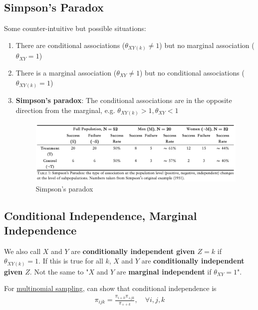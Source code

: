 \documentclass[11pt]{elegantbook}
\begin{document}
\subsection{Simpson's Paradox}
Some counter-intuitive but possible situations:
\begin{enumerate}
    \item There are conditional associations ($\theta_{XY(k)} \neq 1$) but no marginal
    association ($\theta_{XY} = 1$)
    \item There is a marginal association ($\theta_{XY} \neq 1$) but no conditional associations ($\theta_{XY(k)} = 1$)
    \item \textbf{Simpson's paradox}: The conditional associations are in the opposite direction from the marginal, e.g. $\theta_{XY(k)}>1,\theta_{XY}<1$
    \begin{center}\begin{figure}[htbp]
        \centering
        \includegraphics[scale=0.2]{Simpson's Paradox.png}
        \caption{Simpson's paradox}
        \label{}
    \end{figure}\end{center}
\end{enumerate}

\subsection{Conditional Independence, Marginal Independence}
\begin{definition}
    We also call $X$ and $Y$ are \textbf{conditionally independent given $Z = k$} if $\theta_{XY(k)}=1$. If this is true for all $k$, $X$ and $Y$ are \textbf{conditionally independent given $Z$}. Not the same to "$X$ and $Y$ are \textbf{marginal independent} if $\theta_{XY}=1$".
\end{definition}

\begin{proposition}
    For \underline{multinomial sampling}, can show that conditional independence is
    \begin{equation}
        \begin{aligned}
            \pi_{ijk}=\frac{\pi_{i+k}\pi_{+jk}}{\pi_{++k}},\quad \forall i,j,k
        \end{aligned}
        \nonumber
    \end{equation}
\end{proposition}
\end{document}
